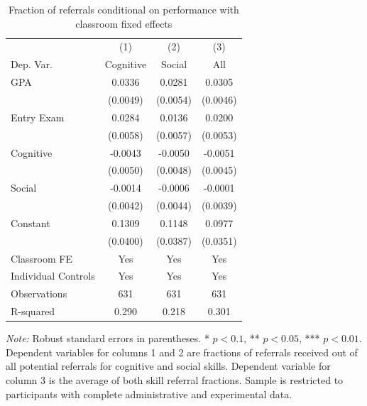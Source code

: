 \documentclass[11pt,a4paper,oneside]{article}
\begin{document}
\begin{table}
\centering
\begin{threeparttable}
\caption{Fraction of referrals conditional on performance with classroom fixed effects}\label{tab:regression-results-1-appendix2}
\begin{tabular*}{0.85\textwidth}{@{\extracolsep{\fill}}l c c c@{}}
\toprule
& (1) & (2) & (3) \\
Dep. Var. & Cognitive & Social & All \\
\midrule
GPA & 0.0336\tnote{***} & 0.0281\tnote{***} & 0.0305\tnote{***} \\
& (0.0049) & (0.0054) & (0.0046) \\
Entry Exam & 0.0284\tnote{***} & 0.0136\tnote{**} & 0.0200\tnote{***} \\
& (0.0058) & (0.0057) & (0.0053) \\
Cognitive & -0.0043 & -0.0050 & -0.0051 \\
& (0.0050) & (0.0048) & (0.0045) \\
Social & -0.0014 & -0.0006 & -0.0001 \\
& (0.0042) & (0.0044) & (0.0039) \\
Constant & 0.1309\tnote{***} & 0.1148\tnote{***} & 0.0977\tnote{***} \\
& (0.0400) & (0.0387) & (0.0351) \\
\midrule
Classroom FE & Yes & Yes & Yes \\
Individual Controls & Yes & Yes & Yes \\
Observations & 631 & 631 & 631 \\
R-squared & 0.290 & 0.218 & 0.301 \\
\bottomrule
\end{tabular*}
\begin{tablenotes}[flushleft]
\footnotesize
\item[] \textit{Note:} Robust standard errors in parentheses. * $p < 0.1$, ** $p < 0.05$, *** $p < 0.01$. Dependent variables for columns 1 and 2 are fractions of referrals received out of all potential referrals for cognitive and social skills. Dependent variable for column 3 is the average of both skill referral fractions. Sample is restricted to participants with complete administrative and experimental data.
\end{tablenotes}
\end{threeparttable}
\end{table}
\end{document}
